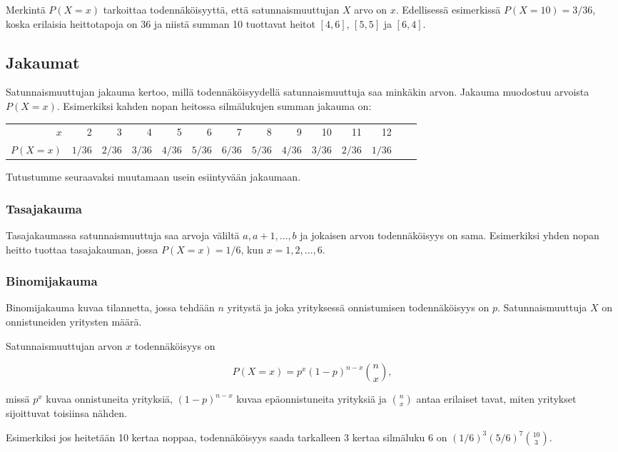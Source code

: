 Merkintä $P(X=x)$ tarkoittaa todennäköisyyttä,
että satunnaismuuttujan $X$ arvo on $x$.
Edellisessä esimerkissä $P(X=10)=3/36$,
koska erilaisia heittotapoja on 36
ja niistä summan 10 tuottavat heitot
$[4,6]$, $[5,5]$ ja $[6,4]$.

\subsection{Jakaumat}

Satunnaismuuttujan jakauma kertoo,
millä todennäköisyydellä satunnaismuuttuja
saa minkäkin arvon.
Jakauma muodostuu arvoista $P(X=x)$.
Esimerkiksi kahden nopan heitossa
silmälukujen summan jakauma on:
\begin{center}
\small {
\begin{tabular}{r|rrrrrrrrrrrrr}
$x$ & 2 & 3 & 4 & 5 & 6 & 7 & 8 & 9 & 10 & 11 & 12 \\
$P(X=x)$ & $1/36$ & $2/36$ & $3/36$ & $4/36$ & $5/36$ & $6/36$ & $5/36$ & $4/36$ & $3/36$ & $2/36$ & $1/36$ \\
\end{tabular}
}
\end{center}
Tutustumme seuraavaksi muutamaan usein esiintyvään jakaumaan.

\subsubsection*{Tasajakauma}

Tasajakaumassa satunnaismuuttuja
saa arvoja väliltä $a,a+1,\ldots,b$
ja jokaisen arvon todennäköisyys on sama.
Esimerkiksi yhden nopan heitto tuottaa tasajakauman,
jossa $P(X=x)=1/6$, kun $x=1,2,\ldots,6$.

\subsubsection*{Binomijakauma}

Binomijakauma kuvaa tilannetta, jossa tehdään $n$
yritystä ja joka yrityksessä onnistumisen
todennäköisyys on $p$. Satunnaismuuttuja $X$
on onnistuneiden yritysten määrä.

Satunnaismuuttujan arvon $x$ todennäköisyys on

\[P(X=x)=p^x (1-p)^{n-x} {n \choose x},\]

missä $p^x$ kuvaa onnistuneita yrityksiä,
$(1-p)^{n-x}$ kuvaa epäonnistuneita yrityksiä
ja ${n \choose x}$ antaa erilaiset tavat,
miten yritykset sijoittuvat toisiinsa nähden.

Esimerkiksi jos heitetään 10 kertaa noppaa,
todennäköisyys saada tarkalleen 3 kertaa silmäluku 6
on $(1/6)^3 (5/6)^7 {10 \choose 3}$.

